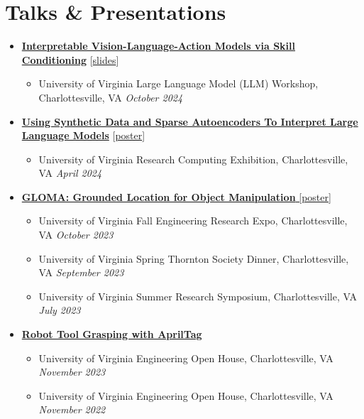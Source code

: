 \documentclass[letterpaper,11pt]{article}
\newcommand{\linkhref}[2]{\textcolor{linkblue}{\href{#1}{#2}}}
\newcommand{\Date}[1]{\textit{\small #1}}
\begin{document}
\section{Talks \& Presentations}
\begin{itemize}[label={}, leftmargin=0pt]
    \item {\href{https://www.brandonyifanyang.com/skillvla.pdf}{\textbf{Interpretable Vision-Language-Action Models via Skill Conditioning}} [\linkhref{https://www.brandonyifanyang.com/skillvla.pdf}{slides}]}
          \begin{itemize}
              \item University of Virginia Large Language Model (LLM) Workshop, Charlottesville, VA \hfill \Date{October 2024}
          \end{itemize}
    \item {\href{https://www.brandonyifanyang.com/MI.pdf}{\textbf{Using Synthetic Data and Sparse Autoencoders To Interpret Large Language Models}} [\linkhref{https://www.brandonyifanyang.com/MI.pdf}{poster}]}
          \begin{itemize}
              \item University of Virginia Research Computing Exhibition, Charlottesville, VA \hfill \Date{April 2024}
          \end{itemize}
    \item \href{https://www.brandonyifanyang.com/gloma.pdf}{\textbf{GLOMA: Grounded Location for Object Manipulation} [\linkhref{https://www.brandonyifanyang.com/gloma.pdf}{poster}]}
          \begin{itemize}
              \item University of Virginia Fall Engineering Research Expo, Charlottesville, VA \hfill \Date{October 2023}
              \item University of Virginia Spring Thornton Society Dinner, Charlottesville, VA \hfill \Date{September 2023}
              \item University of Virginia Summer Research Symposium, Charlottesville, VA \hfill \Date{July 2023}
          \end{itemize}
    \item \href{https://github.com/branyang02/apriltag_detection}{\textbf{Robot Tool Grasping with AprilTag}}
          \begin{itemize}
              \item University of Virginia Engineering Open House, Charlottesville, VA \hfill \Date{November 2023}
              \item University of Virginia Engineering Open House, Charlottesville, VA \hfill \Date{November 2022}
          \end{itemize}
\end{itemize}
\end{document}
